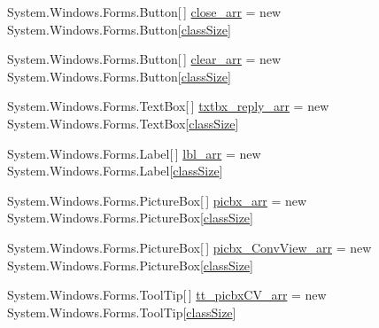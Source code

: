 \begin{DoxyCompactItemize}
\item 
\-System.\-Windows.\-Forms.\-Button\mbox{[}$\,$\mbox{]} \hyperlink{class_sr_p___classroom_inq_1_1frm_classrrom_inq_a4758f35d344b79b972e88a42cb660904}{close\-\_\-arr} = new \-System.\-Windows.\-Forms.\-Button\mbox{[}\hyperlink{class_sr_p___classroom_inq_1_1frm_classrrom_inq_a78d9aab335edfe53d39036b9d89928a8}{class\-Size}\mbox{]}
\item 
\-System.\-Windows.\-Forms.\-Button\mbox{[}$\,$\mbox{]} \hyperlink{class_sr_p___classroom_inq_1_1frm_classrrom_inq_a1c427c3d5bb61c96ca798e5f6aaff8f4}{clear\-\_\-arr} = new \-System.\-Windows.\-Forms.\-Button\mbox{[}\hyperlink{class_sr_p___classroom_inq_1_1frm_classrrom_inq_a78d9aab335edfe53d39036b9d89928a8}{class\-Size}\mbox{]}
\item 
\-System.\-Windows.\-Forms.\-Text\-Box\mbox{[}$\,$\mbox{]} \hyperlink{class_sr_p___classroom_inq_1_1frm_classrrom_inq_a3411157caafbe33c31a364fafd548afb}{txtbx\-\_\-reply\-\_\-arr} = new \-System.\-Windows.\-Forms.\-Text\-Box\mbox{[}\hyperlink{class_sr_p___classroom_inq_1_1frm_classrrom_inq_a78d9aab335edfe53d39036b9d89928a8}{class\-Size}\mbox{]}
\item 
\-System.\-Windows.\-Forms.\-Label\mbox{[}$\,$\mbox{]} \hyperlink{class_sr_p___classroom_inq_1_1frm_classrrom_inq_a7f0a5f5fff7a87e841b2793f89dcd997}{lbl\-\_\-arr} = new \-System.\-Windows.\-Forms.\-Label\mbox{[}\hyperlink{class_sr_p___classroom_inq_1_1frm_classrrom_inq_a78d9aab335edfe53d39036b9d89928a8}{class\-Size}\mbox{]}
\item 
\-System.\-Windows.\-Forms.\-Picture\-Box\mbox{[}$\,$\mbox{]} \hyperlink{class_sr_p___classroom_inq_1_1frm_classrrom_inq_a067a85853fc3e38cf6343917c4fb061a}{picbx\-\_\-arr} = new \-System.\-Windows.\-Forms.\-Picture\-Box\mbox{[}\hyperlink{class_sr_p___classroom_inq_1_1frm_classrrom_inq_a78d9aab335edfe53d39036b9d89928a8}{class\-Size}\mbox{]}
\item 
\-System.\-Windows.\-Forms.\-Picture\-Box\mbox{[}$\,$\mbox{]} \hyperlink{class_sr_p___classroom_inq_1_1frm_classrrom_inq_a4d179283a68569b1220534d91ddcf6d1}{picbx\-\_\-\-Conv\-View\-\_\-arr} = new \-System.\-Windows.\-Forms.\-Picture\-Box\mbox{[}\hyperlink{class_sr_p___classroom_inq_1_1frm_classrrom_inq_a78d9aab335edfe53d39036b9d89928a8}{class\-Size}\mbox{]}
\item 
\-System.\-Windows.\-Forms.\-Tool\-Tip\mbox{[}$\,$\mbox{]} \hyperlink{class_sr_p___classroom_inq_1_1frm_classrrom_inq_a2b443a71216ac1b9a63f9db496161a4d}{tt\-\_\-picbx\-C\-V\-\_\-arr} = new \-System.\-Windows.\-Forms.\-Tool\-Tip\mbox{[}\hyperlink{class_sr_p___classroom_inq_1_1frm_classrrom_inq_a78d9aab335edfe53d39036b9d89928a8}{class\-Size}\mbox{]}

\end{DoxyCompactItemize}
